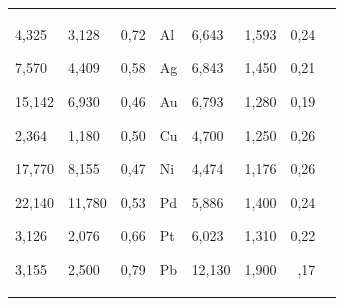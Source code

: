 \begin{table}[t!]
\begin{tabular}{p{1.4cm}|p{1.4cm}|p{1.4cm}|p{.8cm}|p{1.4cm}|p{1.4cm}|p{1.4cm}|p{.8cm}}
4,325 \par 7,570 \par 15,142 \par 2,364 \par 17,770 \par 22,140 \par 3,126 \par 3,155& \centering

3,128 \par 4,409 \par 6,930 \par 1,180 \par 8,155 \par 11,780 \par 2,076 \par 2,500& \centering

0,72 \par 0,58 \par 0,46 \par 0,50 \par 0,47 \par 0,53 \par 0,66 \par 0,79& \centering

Al \par Ag \par Au \par Cu \par Ni \par Pd \par Pt \par Pb& \centering

6,643 \par 6,843 \par 6,793 \par 4,700 \par 4,474 \par 5,886 \par 6,023 \par 12,130& \centering

1,593 \par 1,450 \par 1,280 \par 1,250 \par 1,176 \par 1,400 \par 1,310 \par 1,900& {\centering

0,24 \par 0,21 \par 0,19 \par 0,26 \par 0,26 \par 0,24 \par 0,22 \par }~\!0,17 \\


\end{tabular}
\end{table}
